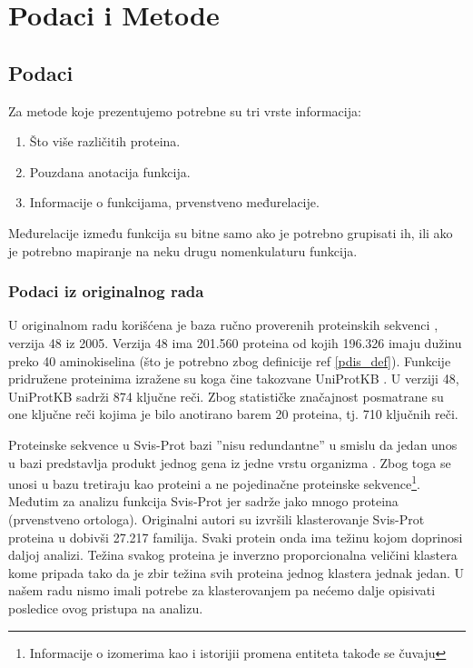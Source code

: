 
\chapter{Podaci i Metode} %

\label{Podaci i Metode} %



\section {Podaci}

Za metode koje prezentujemo potrebne su tri vrste informacija:
\begin{enumerate}
  \item Što više različitih proteina.
  \item Pouzdana anotacija funkcija.
  \item Informacije o funkcijama, prvenstveno međurelacije.
\end{enumerate}

Međurelacije između funkcija su bitne samo ako je potrebno grupisati ih,
ili ako je potrebno mapiranje na neku drugu nomenkulaturu funkcija.

\subsection{Podaci iz originalnog rada}

U originalnom radu \parencite{Xie2007} korišćena je  baza ručno proverenih
proteinskih sekvenci  , verzija 48 iz 2005.
Verzija 48 ima 201.560 proteina od kojih 196.326 imaju dužinu preko 40
aminokiselina (što je potrebno zbog definicije ref \ref{pdis_def}). Funkcije
pridružene proteinima izražene su 
 koga čine takozvane UniProtKB 
. U verziji 48, UniProtKB sadrži 874 ključne reči.  Zbog
statističke značajnost posmatrane su one ključne reči kojima je bilo anotirano
barem 20 proteina, tj. 710 ključnih reči.

Proteinske sekvence u Svis-Prot bazi ''nisu redundantne'' u smislu da jedan
unos u bazi predstavlja produkt jednog gena iz jedne vrstu organizma
\parencite{nonRedundant}. Zbog toga se unosi u bazu tretiraju kao proteini a ne
pojedinačne proteinske sekvence\footnote{Informacije o izomerima kao i
istorijii promena entiteta takođe se čuvaju}.  Međutim za analizu funkcija
Svis-Prot  jer sadrže jako mnogo
 proteina (prvenstveno ortologa).  Originalni autori
\parencite{Xie2007} su izvršili klasterovanje Svis-Prot proteina u
 dobivši 27.217 familija. Svaki protein onda ima
težinu kojom doprinosi daljoj analizi. Težina svakog proteina je inverzno
proporcionalna veličini klastera kome pripada tako da je zbir težina svih
proteina jednog klastera jednak jedan.  U našem radu nismo imali potrebe za
klasterovanjem pa nećemo dalje opisivati posledice ovog pristupa na analizu.

